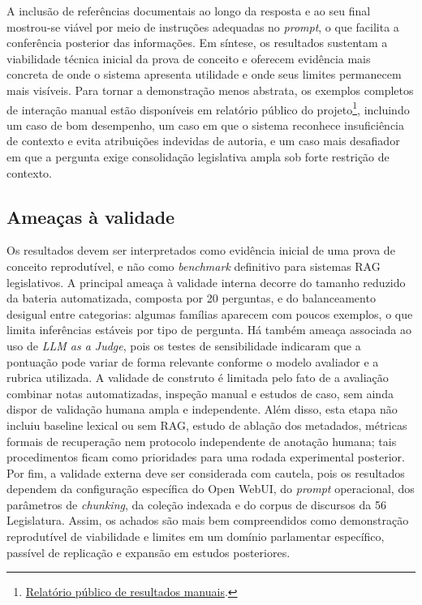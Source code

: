 A inclusão de referências documentais ao longo da resposta e ao seu final mostrou-se viável por meio de instruções adequadas no \textit{prompt}, o que facilita a conferência posterior das informações. Em síntese, os resultados sustentam a viabilidade técnica inicial da prova de conceito e oferecem evidência mais concreta de onde o sistema apresenta utilidade e onde seus limites permanecem mais visíveis. Para tornar a demonstração menos abstrata, os exemplos completos de interação manual estão disponíveis em relatório público do projeto\footnote{\href{https://github.com/fabriciosantana/mcdia/blob/main/05-iag/4-project/eval-openwebui/RESULTS.md}{Relatório público de resultados manuais}.}, incluindo um caso de bom desempenho, um caso em que o sistema reconhece insuficiência de contexto e evita atribuições indevidas de autoria, e um caso mais desafiador em que a pergunta exige consolidação legislativa ampla sob forte restrição de contexto.

\subsection{Ameaças à validade}

Os resultados devem ser interpretados como evidência inicial de uma prova de conceito reprodutível, e não como \textit{benchmark} definitivo para sistemas RAG legislativos. A principal ameaça à validade interna decorre do tamanho reduzido da bateria automatizada, composta por 20 perguntas, e do balanceamento desigual entre categorias: algumas famílias aparecem com poucos exemplos, o que limita inferências estáveis por tipo de pergunta. Há também ameaça associada ao uso de \textit{LLM as a Judge}, pois os testes de sensibilidade indicaram que a pontuação pode variar de forma relevante conforme o modelo avaliador e a rubrica utilizada. A validade de construto é limitada pelo fato de a avaliação combinar notas automatizadas, inspeção manual e estudos de caso, sem ainda dispor de validação humana ampla e independente. Além disso, esta etapa não incluiu baseline lexical ou sem RAG, estudo de ablação dos metadados, métricas formais de recuperação nem protocolo independente de anotação humana; tais procedimentos ficam como prioridades para uma rodada experimental posterior. Por fim, a validade externa deve ser considerada com cautela, pois os resultados dependem da configuração específica do Open WebUI, do \textit{prompt} operacional, dos parâmetros de \textit{chunking}, da coleção indexada e do corpus de discursos da 56\textordfeminine{} Legislatura. Assim, os achados são mais bem compreendidos como demonstração reprodutível de viabilidade e limites em um domínio parlamentar específico, passível de replicação e expansão em estudos posteriores.

